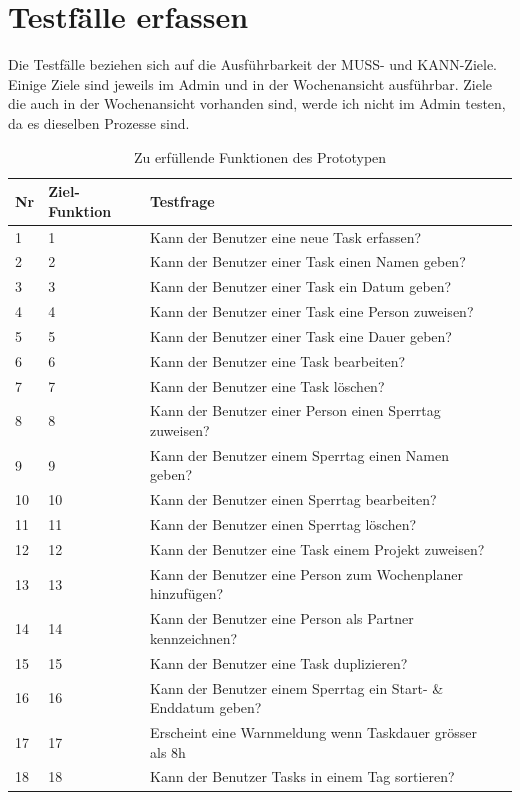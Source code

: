 \section{Testfälle erfassen}
Die Testfälle beziehen sich auf die Ausführbarkeit der MUSS- und KANN-Ziele.
Einige Ziele sind jeweils im Admin und in der Wochenansicht ausführbar.
Ziele die auch in der Wochenansicht vorhanden sind, werde ich nicht im Admin testen, da es dieselben Prozesse sind.
\begin{table}[!ht]
\begin{center}
    \begin{tabular}{llp{12cm}l}
        \toprule Nr & Ziel-Funktion & Testfrage \\
        \midrule 1 & 1 & Kann der Benutzer eine neue Task erfassen?\\
        \midrule 2 & 2 & Kann der Benutzer einer Task einen Namen geben? \\
        \midrule 3 & 3 & Kann der Benutzer einer Task ein Datum geben? \\
        \midrule 4 & 4 & Kann der Benutzer einer Task eine Person zuweisen? \\
        \midrule 5 & 5 & Kann der Benutzer einer Task eine Dauer geben? \\
        \midrule 6 & 6 & Kann der Benutzer eine Task bearbeiten? \\ 
        \midrule 7 & 7 & Kann der Benutzer eine Task löschen? \\
        \midrule 8 & 8 & Kann der Benutzer einer Person einen Sperrtag zuweisen? \\
        \midrule 9 & 9 & Kann der Benutzer einem Sperrtag einen Namen geben? \\
        \midrule 10 & 10 & Kann der Benutzer einen Sperrtag bearbeiten?\\
        \midrule 11 & 11 & Kann der Benutzer einen Sperrtag löschen?\\
        \midrule 12 & 12 & Kann der Benutzer eine Task einem Projekt zuweisen?\\
        \midrule 13 & 13 & Kann der Benutzer eine Person zum Wochenplaner hinzufügen?\\
        \midrule 14 & 14 & Kann der Benutzer eine Person als Partner kennzeichnen?\\
        \midrule 15 & 15 & Kann der Benutzer eine Task duplizieren?\\
        \midrule 16 & 16 & Kann der Benutzer einem Sperrtag ein Start- \& Enddatum geben?\\
        \midrule 17 & 17 & Erscheint eine Warnmeldung wenn Taskdauer grösser als 8h \\
        \midrule 18 & 18 & Kann der Benutzer Tasks in einem Tag sortieren?\\
        \bottomrule
    \end{tabular}
    \caption{Zu erfüllende Funktionen des Prototypen}
    \label{tab:testing_muss_funktionen}
\end{center}
\end{table}
